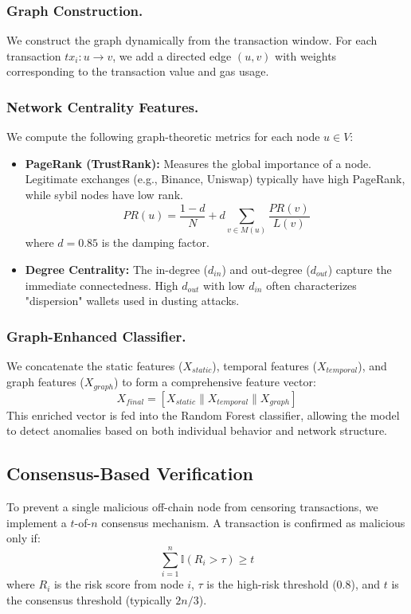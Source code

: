\subsubsection{Graph Construction.}
We construct the graph dynamically from the transaction window. For each transaction $tx_{i} : u \to v$, we add a directed edge $(u, v)$ with weights corresponding to the transaction value and gas usage.

\subsubsection{Network Centrality Features.}
We compute the following graph-theoretic metrics for each node $u \in V$:
\begin{itemize}
    \item \textbf{PageRank (TrustRank):} Measures the global importance of a node. Legitimate exchanges (e.g., Binance, Uniswap) typically have high PageRank, while sybil nodes have low rank.
    \begin{equation}
        PR(u) = \frac{1-d}{N} + d \sum_{v \in M(u)} \frac{PR(v)}{L(v)}
    \end{equation}
    where $d=0.85$ is the damping factor.
    \item \textbf{Degree Centrality:} The in-degree ($d_{in}$) and out-degree ($d_{out}$) capture the immediate connectedness. High $d_{out}$ with low $d_{in}$ often characterizes "dispersion" wallets used in dusting attacks.
\end{itemize}

\subsubsection{Graph-Enhanced Classifier.}
We concatenate the static features ($X_{static}$), temporal features ($X_{temporal}$), and graph features ($X_{graph}$) to form a comprehensive feature vector:
\begin{equation}
    X_{final} = [X_{static} \parallel X_{temporal} \parallel X_{graph}]
\end{equation}
This enriched vector is fed into the Random Forest classifier, allowing the model to detect anomalies based on both individual behavior and network structure.

\subsection{Consensus-Based Verification}
To prevent a single malicious off-chain node from censoring transactions, we implement a $t$-of-$n$ consensus mechanism. A transaction is confirmed as malicious only if:
\begin{equation}
    \sum_{i=1}^{n} \mathbb{I}(R_i > \tau) \geq t
\end{equation}
where $R_i$ is the risk score from node $i$, $\tau$ is the high-risk threshold (0.8), and $t$ is the consensus threshold (typically $2n/3$).

